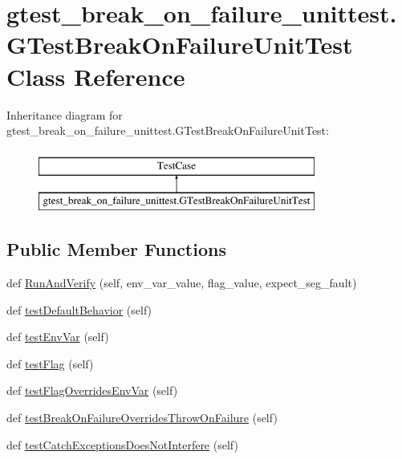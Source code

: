 \hypertarget{classgtest__break__on__failure__unittest_1_1_g_test_break_on_failure_unit_test}{}\section{gtest\+\_\+break\+\_\+on\+\_\+failure\+\_\+unittest.\+G\+Test\+Break\+On\+Failure\+Unit\+Test Class Reference}
\label{classgtest__break__on__failure__unittest_1_1_g_test_break_on_failure_unit_test}
Inheritance diagram for gtest\+\_\+break\+\_\+on\+\_\+failure\+\_\+unittest.\+G\+Test\+Break\+On\+Failure\+Unit\+Test\+:\begin{figure}[H]
\begin{center}
\leavevmode
\includegraphics[height=2.000000cm]{classgtest__break__on__failure__unittest_1_1_g_test_break_on_failure_unit_test}
\end{center}
\end{figure}
\subsection*{Public Member Functions}
\begin{DoxyCompactItemize}
\item 
def \mbox{\hyperlink{classgtest__break__on__failure__unittest_1_1_g_test_break_on_failure_unit_test_a0a66475873f545d88655b8bb14368f2e}{Run\+And\+Verify}} (self, env\+\_\+var\+\_\+value, flag\+\_\+value, expect\+\_\+seg\+\_\+fault)
\item 
def \mbox{\hyperlink{classgtest__break__on__failure__unittest_1_1_g_test_break_on_failure_unit_test_a8c21b7ecccc27268cb6c3d30b933b812}{test\+Default\+Behavior}} (self)
\item 
def \mbox{\hyperlink{classgtest__break__on__failure__unittest_1_1_g_test_break_on_failure_unit_test_a2beae948940a4fd898c8183c3bb221da}{test\+Env\+Var}} (self)
\item 
def \mbox{\hyperlink{classgtest__break__on__failure__unittest_1_1_g_test_break_on_failure_unit_test_af6018e5253c1107c5afaba3e2cb573fe}{test\+Flag}} (self)
\item 
def \mbox{\hyperlink{classgtest__break__on__failure__unittest_1_1_g_test_break_on_failure_unit_test_a15836ddb27e51e9aaf2f8aad84f5cef7}{test\+Flag\+Overrides\+Env\+Var}} (self)
\item 
def \mbox{\hyperlink{classgtest__break__on__failure__unittest_1_1_g_test_break_on_failure_unit_test_a3c5855e045236a309a5bff73ee6b503e}{test\+Break\+On\+Failure\+Overrides\+Throw\+On\+Failure}} (self)
\item 
def \mbox{\hyperlink{classgtest__break__on__failure__unittest_1_1_g_test_break_on_failure_unit_test_a70cc7732ac68ffe587657a3a5309aa4a}{test\+Catch\+Exceptions\+Does\+Not\+Interfere}} (self)
\end{DoxyCompactItemize}


